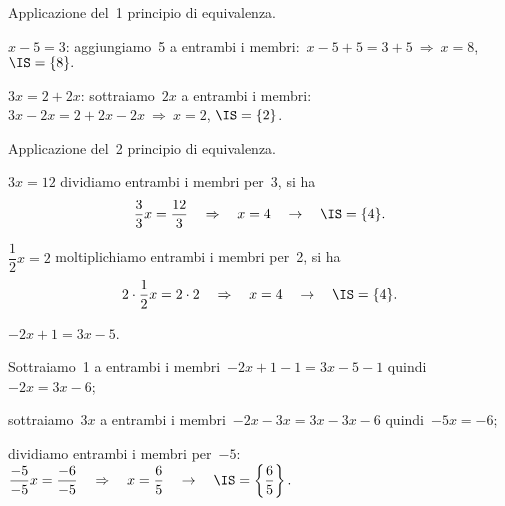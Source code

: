 \begin{exrig}
 \begin{esempio}
Applicazione del~1{\textdegree} principio di equivalenza.

\begin{enumeratea}
\item $x-5=3$:
aggiungiamo~5 a entrambi i membri:~$x-5+5=3+5\:\Rightarrow\: x=8$, $\IS =\{8\}.$
\item $3x=2+2x$: sottraiamo~$2x$ a entrambi i membri:~$3x-2x=2+2x-2x\:\Rightarrow\: x=2$,
$\IS =\{2\}$.
\end{enumeratea}
 \end{esempio}

 \begin{esempio}
 Applicazione del~2{\textdegree} principio di equivalenza.

 \begin{enumeratea}
\item $3x=12$ dividiamo entrambi i membri per~3, si ha
\[\dfrac{3}{3}x=\dfrac{12}{3}\quad\Rightarrow\quad x=4\quad\to\quad\IS =\{4\}.\]
\item $\dfrac{1}{2}x=2$ moltiplichiamo entrambi i membri per~2, si ha
\[2\cdot {\dfrac{1}{2}}x=2\cdot 2\quad\Rightarrow\quad x=4\quad\to\quad\IS =\{4\}.\]
\end{enumeratea}
\end{esempio}

 \begin{esempio}
 $-2x+1=3x-5$.

\begin{enumeratea}
 \item Sottraiamo~1 a entrambi i membri~$-2x+1-1=3x-5-1$ quindi~$-2x=3x-6$;
\item sottraiamo~$3x$ a entrambi i membri~$-2x-3x=3x-3x-6$ quindi~$-5x=-6$;
\item dividiamo entrambi i membri per~$-5$:~$\dfrac{-5}{-5}x=\dfrac{-6}{-5}\quad\Rightarrow\quad x=\dfrac{6}{5}\quad\rightarrow\quad
\IS =\left\{\dfrac{6}{5}\right\}.$
\end{enumeratea}
 \end{esempio}


\end{exrig}
